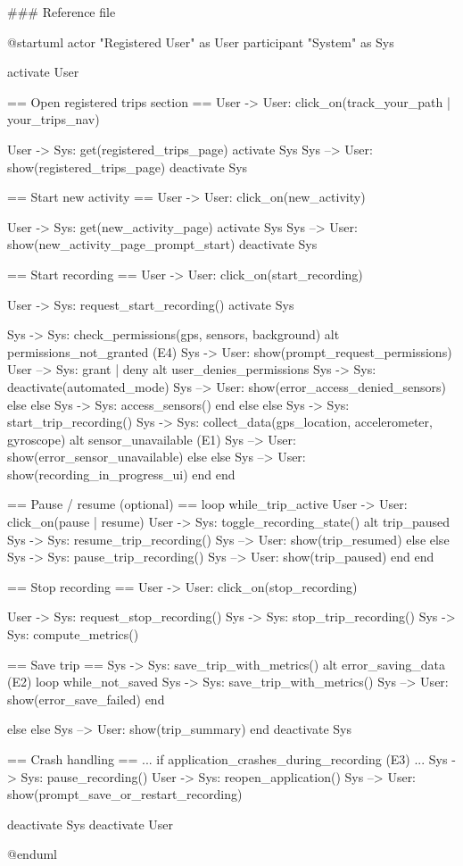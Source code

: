 ### Reference file

@startuml
actor "Registered User" as User
participant "System" as Sys

activate User

== Open registered trips section ==
User -> User: click_on(track_your_path | your_trips_nav)

User -> Sys: get(registered_trips_page)
activate Sys
Sys --> User: show(registered_trips_page)
deactivate Sys

== Start new activity ==
User -> User: click_on(new_activity)

User -> Sys: get(new_activity_page)
activate Sys
Sys --> User: show(new_activity_page_prompt_start)
deactivate Sys

== Start recording ==
User -> User: click_on(start_recording)

User -> Sys: request_start_recording()
activate Sys

Sys -> Sys: check_permissions(gps, sensors, background)
alt permissions_not_granted (E4)
    Sys -> User: show(prompt_request_permissions)
    User --> Sys: grant | deny
    alt user_denies_permissions
       Sys -> Sys: deactivate(automated_mode)
       Sys --> User: show(error_access_denied_sensors)
    else else
       Sys -> Sys: access_sensors()
    end
else else
    Sys -> Sys: start_trip_recording()
    Sys -> Sys: collect_data(gps_location, accelerometer, gyroscope)
    alt sensor_unavailable (E1)
        Sys --> User: show(error_sensor_unavailable)
    else else
        Sys --> User: show(recording_in_progress_ui)
    end
end

== Pause / resume (optional) ==
loop while_trip_active
    User -> User: click_on(pause | resume)
    User -> Sys: toggle_recording_state()
    alt trip_paused
       Sys -> Sys: resume_trip_recording()
       Sys --> User: show(trip_resumed)
    else else 
       Sys -> Sys: pause_trip_recording()
       Sys --> User: show(trip_paused)
    end
end

== Stop recording ==
User -> User: click_on(stop_recording)

User -> Sys: request_stop_recording()
Sys -> Sys: stop_trip_recording()
Sys -> Sys: compute_metrics()

== Save trip ==
Sys -> Sys: save_trip_with_metrics()
alt error_saving_data (E2)
    loop while_not_saved
       Sys -> Sys: save_trip_with_metrics()
       Sys --> User: show(error_save_failed)
    end
    
else else
    Sys --> User: show(trip_summary)
end
deactivate Sys

== Crash handling ==
... if application_crashes_during_recording (E3) ...
Sys -> Sys: pause_recording()
User -> Sys: reopen_application()
Sys --> User: show(prompt_save_or_restart_recording)

deactivate Sys
deactivate User

@enduml